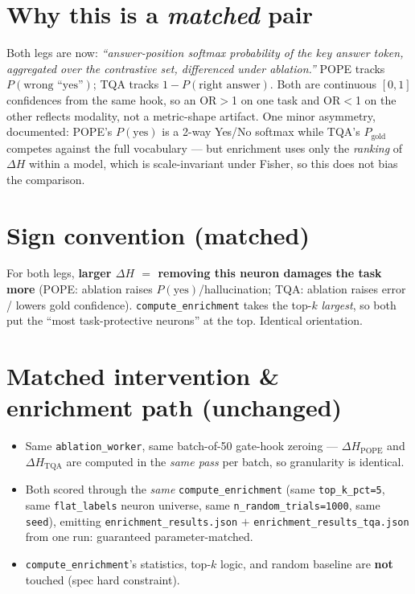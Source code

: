 \documentclass[11pt,a4paper]{article}
\newcommand{\code}[1]{\texttt{#1}}
\begin{document}
\section{Why this is a \emph{matched} pair}
Both legs are now: \emph{``answer-position softmax probability of the key answer token,
aggregated over the contrastive set, differenced under ablation.''} POPE tracks
$P(\text{wrong ``yes''})$; TQA tracks $1 - P(\text{right answer})$. Both are continuous
$[0,1]$ confidences from the same hook, so an OR$>$1 on one task and OR$<$1 on the other
reflects modality, not a metric-shape artifact. One minor asymmetry, documented: POPE's
$P(\text{yes})$ is a 2-way Yes/No softmax while TQA's $P_{\text{gold}}$ competes against the
full vocabulary --- but enrichment uses only the \emph{ranking} of $\Delta H$ within a
model, which is scale-invariant under Fisher, so this does not bias the comparison.

\section{Sign convention (matched)}
For both legs, \textbf{larger $\Delta H$ $=$ removing this neuron damages the task more}
(POPE: ablation raises $P(\text{yes})$/hallucination; TQA: ablation raises error / lowers gold
confidence). \code{compute\_enrichment} takes the top-$k$ \emph{largest}, so both put the
``most task-protective neurons'' at the top. Identical orientation.

\section{Matched intervention \& enrichment path (unchanged)}
\begin{itemize}[nosep]
\item Same \code{ablation\_worker}, same batch-of-50 gate-hook zeroing ---
$\Delta H_{\text{POPE}}$ and $\Delta H_{\text{TQA}}$ are computed in the \emph{same pass} per
batch, so granularity is identical.
\item Both scored through the \emph{same} \code{compute\_enrichment} (same
\code{top\_k\_pct=5}, same \code{flat\_labels} neuron universe, same
\code{n\_random\_trials=1000}, same \code{seed}), emitting \code{enrichment\_results.json}
$+$ \code{enrichment\_results\_tqa.json} from one run: guaranteed parameter-matched.
\item \code{compute\_enrichment}'s statistics, top-$k$ logic, and random baseline are
\textbf{not} touched (spec hard constraint).
\end{itemize}
\end{document}
